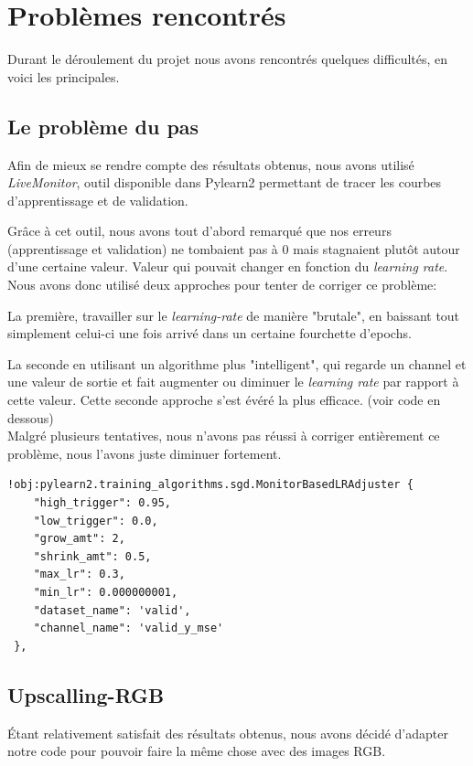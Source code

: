 \documentclass[12pt, a4paper]{article}
\begin{document}
\newpage
\section{Problèmes rencontrés}
Durant le déroulement du projet nous avons rencontrés quelques difficultés, en voici les principales. 
	\subsection{Le problème du pas}
Afin de mieux se rendre compte des résultats obtenus, nous avons utilisé \emph{LiveMonitor}, outil disponible dans Pylearn2 permettant de tracer les courbes d'apprentissage et de validation. 

Grâce à cet outil, nous avons tout d'abord remarqué que nos erreurs (apprentissage et validation) ne tombaient pas à 0 mais stagnaient plutôt autour d'une certaine valeur. Valeur qui pouvait changer en fonction du \emph{learning rate}. 
Nous avons donc utilisé deux approches pour tenter de corriger ce problème:

La première, travailler sur le \emph{learning-rate} de manière "brutale", en baissant tout simplement celui-ci une fois arrivé dans un certaine fourchette d'epochs. 

La seconde en utilisant un algorithme plus "intelligent", qui regarde un channel et une valeur de sortie et fait augmenter ou diminuer le \emph{learning rate} par rapport à cette valeur. Cette seconde approche s'est évéré la plus efficace. (voir code en dessous)
\\

Malgré plusieurs tentatives, nous n'avons pas réussi à corriger entièrement ce problème, nous l'avons juste diminuer fortement.

\begin{verbatim}
!obj:pylearn2.training_algorithms.sgd.MonitorBasedLRAdjuster {
    "high_trigger": 0.95,
    "low_trigger": 0.0,
    "grow_amt": 2,
    "shrink_amt": 0.5,
    "max_lr": 0.3,
    "min_lr": 0.000000001,
    "dataset_name": 'valid',
    "channel_name": 'valid_y_mse'
 },
\end{verbatim}
	
	\subsection{Upscalling-RGB}
Étant relativement satisfait des résultats obtenus, nous avons décidé d'adapter notre code pour pouvoir faire la même chose avec des images RGB. 
\end{document}
